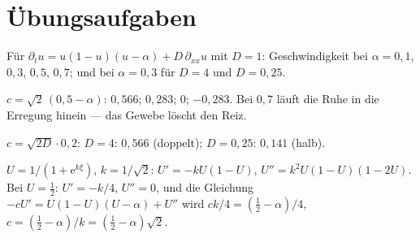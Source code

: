 \section{Übungsaufgaben}

\begin{aufgabe}
Für $\partial_t u = u(1-u)(u-\alpha) + D\,\partial_{xx}u$ mit $D = 1$: Geschwindigkeit bei $\alpha = 0{,}1$, $0{,}3$, $0{,}5$, $0{,}7$; und bei $\alpha = 0{,}3$ für $D = 4$ und $D = 0{,}25$.

\loesung
{}
$c = \sqrt2\,(0{,}5 - \alpha)$: $0{,}566$; $0{,}283$; $0$; $-0{,}283$. Bei $0{,}7$ läuft die Ruhe in die Erregung hinein --- das Gewebe löscht den Reiz.

$c = \sqrt{2D}\cdot0{,}2$: $D = 4$: $0{,}566$ (doppelt); $D = 0{,}25$: $0{,}141$ (halb). \checkmark

$U = 1/(1 + \mathrm e^{k\xi})$, $k = 1/\sqrt2$: $U' = -kU(1-U)$, $U'' = k^{2}U(1-U)(1-2U)$. Bei $U = \tfrac12$: $U' = -k/4$, $U'' = 0$, und die Gleichung $-cU' = U(1-U)(U-\alpha) + U''$ wird $ck/4 = (\tfrac12 - \alpha)/4$, $c = (\tfrac12-\alpha)/k = (\tfrac12-\alpha)\sqrt2$. \checkmark

\begin{center}
\begin{minipage}{0.88\textwidth}
\end{minipage}
\end{center}
\end{aufgabe}

